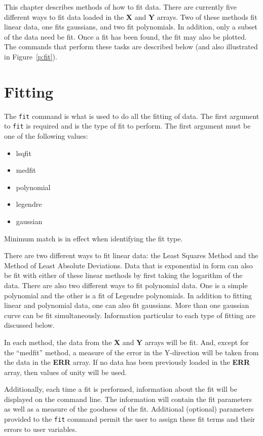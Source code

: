 %
%

This chapter describes methods of how to fit data.
There are currently five different ways to fit data loaded in
the {\bf X} and {\bf Y} arrays.
Two of these methods fit linear data, one fits gaussians, and two
fit polynomials.
In addition, only a subset of the data need be fit.
Once a fit has been found, the fit may also be plotted.
The commands that perform these tasks are described below
(and also illustrated in Figure~\ref{p:fit}).

\section{Fitting}

The {\tt fit}
command is what is used to do all the fitting of data.
The first argument to {\tt fit} is required and is the type of fit to perform.
The first argument must be one of the following values:
\begin{itemize}
  \item lsqfit
  \item medfit
  \item polynomial
  \item legendre
  \item gaussian
\end{itemize}
Minimum match is in effect when identifying the fit type.

There are two different ways to fit linear data:
the Least Squares Method and the Method of Least Absolute Deviations.
Data that is exponential in form can also be fit with either of these
linear methods by first taking the logarithm of the data.
There are also two different ways to fit polynomial data.
One is a simple polynomial and the other is a fit of Legendre polynomials.
In addition to fitting linear and polynomial data, one can also fit gaussians.
More than one gaussian curve can be fit simultaneously.
Information particular to each type of fitting are discussed below.

In each method, the data from
the {\bf X} and {\bf Y} arrays will be fit.
And, except for the ``medfit'' method, a measure of the
error in the Y-direction will be taken from the data in
the {\bf ERR} array.
If no data has been previously loaded in the {\bf ERR} array,
then values of unity will be used.

Additionally, each time a fit is performed,
information about the fit will be displayed on the command line.
The information will contain the fit parameters as well as a measure
of the goodness of the fit.
Additional (optional) parameters provided to the {\tt fit} command permit
the user to assign these fit terms and their errors to
user variables.

